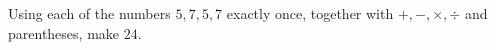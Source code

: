 Using each of the numbers $5,7,5,7$ exactly once, together with $+,-,\times,\div$ and parentheses, make $24$.
